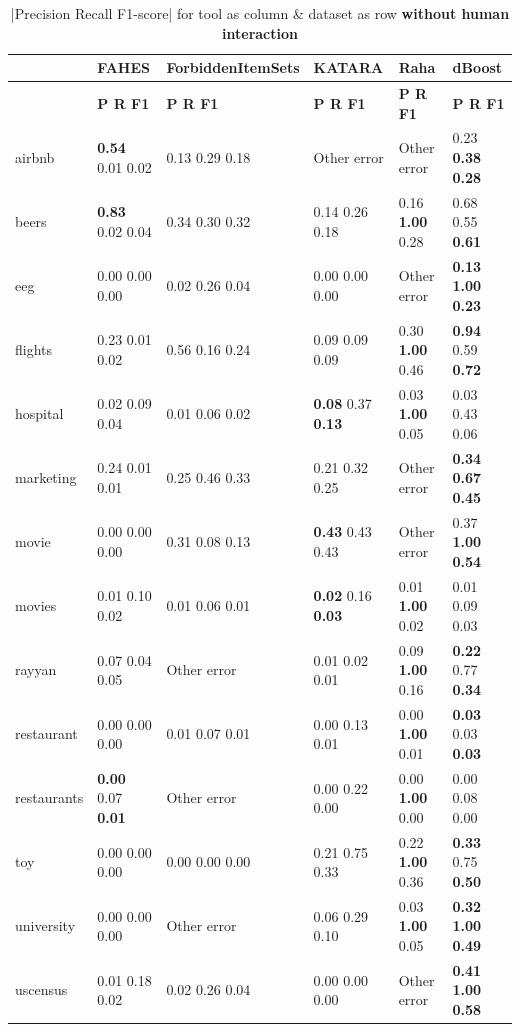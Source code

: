 \begin{table}
\centering
\caption{|Precision Recall F1-score| for tool as column \& dataset as row \textbf{without human interaction}}
\label{tab:empirical_results_no_human}
\begin{adjustbox}{center}
\begin{tabular}{llllll}
\toprule
{} & FAHES & ForbiddenItemSets & KATARA & Raha & dBoost \\
\midrule
 & \textbf{\space\space\space P \space\space\space\space R \space\space\space F1} & \textbf{\space\space\space P \space\space\space\space R \space\space\space F1} & \textbf{\space\space\space P \space\space\space\space R \space\space\space F1} & \textbf{\space\space\space P \space\space\space\space R \space\space\space F1} & \textbf{\space\space\space P \space\space\space\space R \space\space\space F1} \\
airbnb & \textbf{0.54} 0.01 0.02 & 0.13 0.29 0.18 & Other error & Other error & 0.23 \textbf{0.38} \textbf{0.28} \\
beers & \textbf{0.83} 0.02 0.04 & 0.34 0.30 0.32 & 0.14 0.26 0.18 & 0.16 \textbf{1.00} 0.28 & 0.68 0.55 \textbf{0.61} \\
eeg & 0.00 0.00 0.00 & 0.02 0.26 0.04 & 0.00 0.00 0.00 & Other error & \textbf{0.13} \textbf{1.00} \textbf{0.23} \\
flights & 0.23 0.01 0.02 & 0.56 0.16 0.24 & 0.09 0.09 0.09 & 0.30 \textbf{1.00} 0.46 & \textbf{0.94} 0.59 \textbf{0.72} \\
hospital & 0.02 0.09 0.04 & 0.01 0.06 0.02 & \textbf{0.08} 0.37 \textbf{0.13} & 0.03 \textbf{1.00} 0.05 & 0.03 0.43 0.06 \\
marketing & 0.24 0.01 0.01 & 0.25 0.46 0.33 & 0.21 0.32 0.25 & Other error & \textbf{0.34} \textbf{0.67} \textbf{0.45} \\
movie & 0.00 0.00 0.00 & 0.31 0.08 0.13 & \textbf{0.43} 0.43 0.43 & Other error & 0.37 \textbf{1.00} \textbf{0.54} \\
movies & 0.01 0.10 0.02 & 0.01 0.06 0.01 & \textbf{0.02} 0.16 \textbf{0.03} & 0.01 \textbf{1.00} 0.02 & 0.01 0.09 0.03 \\
rayyan & 0.07 0.04 0.05 & Other error & 0.01 0.02 0.01 & 0.09 \textbf{1.00} 0.16 & \textbf{0.22} 0.77 \textbf{0.34} \\
restaurant & 0.00 0.00 0.00 & 0.01 0.07 0.01 & 0.00 0.13 0.01 & 0.00 \textbf{1.00} 0.01 & \textbf{0.03} 0.03 \textbf{0.03} \\
restaurants & \textbf{0.00} 0.07 \textbf{0.01} & Other error & 0.00 0.22 0.00 & 0.00 \textbf{1.00} 0.00 & 0.00 0.08 0.00 \\
toy & 0.00 0.00 0.00 & 0.00 0.00 0.00 & 0.21 0.75 0.33 & 0.22 \textbf{1.00} 0.36 & \textbf{0.33} 0.75 \textbf{0.50} \\
university & 0.00 0.00 0.00 & Other error & 0.06 0.29 0.10 & 0.03 \textbf{1.00} 0.05 & \textbf{0.32} \textbf{1.00} \textbf{0.49} \\
uscensus & 0.01 0.18 0.02 & 0.02 0.26 0.04 & 0.00 0.00 0.00 & Other error & \textbf{0.41} \textbf{1.00} \textbf{0.58} \\
\bottomrule
\end{tabular}
\end{adjustbox}
\end{table}

